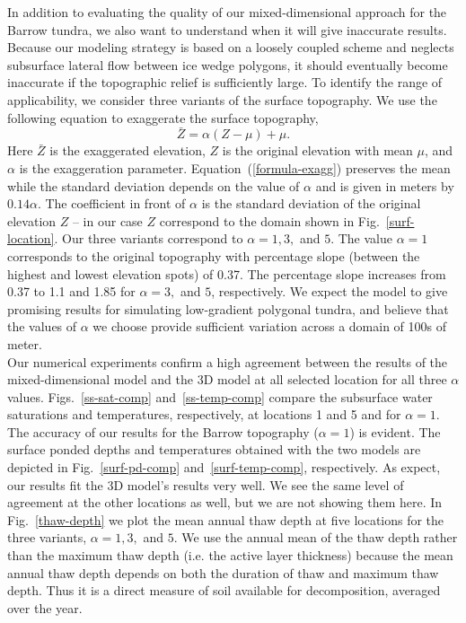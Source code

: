 \documentclass[review]{elsarticle}
\begin{document}
In addition to evaluating the quality of our mixed-dimensional approach for the Barrow tundra, we also want to understand when it will give inaccurate results. Because our modeling strategy is based on a loosely coupled scheme and neglects subsurface lateral flow between ice wedge polygons, it should eventually become inaccurate if the topographic relief is sufficiently large. To identify the range of applicability, we consider three variants of the surface topography.  We use the following equation to exaggerate the surface topography,
\begin{equation}\label{formula-exagg}
\bar{Z} =  \alpha (Z - \mu) + \mu.
\end{equation}
Here $\bar{Z}$ is the exaggerated elevation, $Z$ is the original elevation with mean $\mu$, and $\alpha$ is the exaggeration parameter. Equation~(\ref{formula-exagg})  preserves the mean while the standard deviation depends on the value of $\alpha$ and is given in meters by $0.14 \alpha$. The coefficient in front of $\alpha$ is the standard deviation of the original elevation $Z$ -- in our case $Z$ correspond to the domain shown in Fig.~\ref{surf-location}. Our three variants correspond to $\alpha=1,3,$ and $5$. The value $\alpha=1$ corresponds to the original topography with percentage slope (between the highest and lowest elevation spots) of 0.37. The percentage slope increases from 0.37 to 1.1 and 1.85 for $\alpha =3,$ and $5$, respectively. We expect the model to give promising results for simulating low-gradient polygonal tundra, and believe that the values of $\alpha$ we choose provide sufficient variation across a domain of 100s of meter.  \\
Our numerical experiments confirm a high agreement between the results of the mixed-dimensional model and the 3D model at all selected location for all three $\alpha$ values. Figs.~\ref{ss-sat-comp} and~\ref{ss-temp-comp} compare the subsurface water saturations and temperatures, respectively, at locations 1 and 5 and for $\alpha=1$. The accuracy of our results for the Barrow topography ($\alpha=1$) is evident. The surface ponded depths and temperatures obtained with the two models are depicted in Fig.~\ref{surf-pd-comp} and~\ref{surf-temp-comp}, respectively. As expect, our results fit the 3D model's results very well. We see the same level of agreement at the other locations as well, but we are not showing them here.
In Fig.~\ref{thaw-depth} we plot the mean annual thaw depth at five locations for the three variants, $\alpha =1, 3,$ and $5$. We use the annual mean of the thaw depth rather than the maximum thaw depth (i.e. the active layer thickness) because the mean annual thaw depth depends on both the duration of thaw and maximum thaw depth. Thus it is a direct measure of soil available for decomposition, averaged over the year. 
\end{document}
